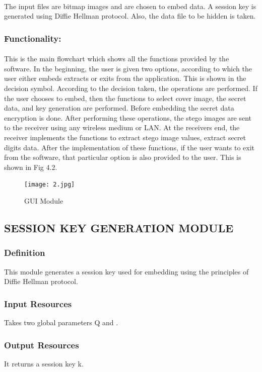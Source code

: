 \documentclass[12pt]{report}
\begin{document}
\paragraph{}The input files are bitmap images and are chosen to embed data. A session key is generated using Diffie Hellman protocol. Also, the data file to be hidden is taken.
\subsubsection{Functionality:} 
\paragraph{}This is the main flowchart which shows all the functions provided by the software. In the beginning, the user is given two options, according to which the user either embeds extracts or exits from the application. This is shown in the decision symbol. According to the decision taken, the operations are performed. If the user chooses to embed, then the functions to select cover image, the secret data, and key generation are performed. Before embedding the secret data encryption is done. After performing these operations, the stego images are sent to the receiver using any wireless medium or LAN. At the receivers end, the receiver implements the functions to extract stego image values, extract secret digits data. After the implementation of these functions, if the user wants to exit from the software, that particular option is also provided to the user. This is shown in Fig 4.2.
\begin{figure}[h!]
	\centering
		\texttt{[image: 2.jpg]}
		\caption{GUI Module}
\end{figure} 
\pagebreak
\subsection{SESSION KEY GENERATION MODULE}
\subsubsection{Definition}
This module generates a session key used for embedding using the principles of Diffie Hellman protocol.
\subsubsection{Input Resources}
Takes two global parameters Q and \alpha{}.
\subsubsection{Output Resources}
It returns a session key k.
\end{document}
